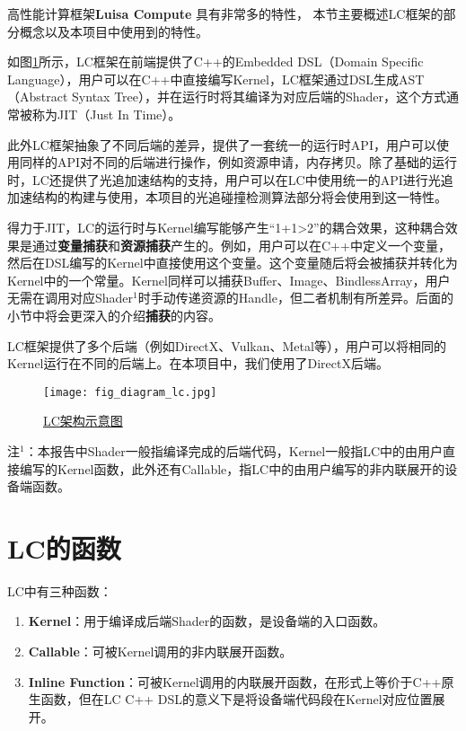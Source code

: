 高性能计算框架\textbf{Luisa Compute} \cite{zhengLuisaRenderHighPerformanceRendering2022}
具有非常多的特性，
本节主要概述LC框架的部分概念以及本项目中使用到的特性。

如图\ref{fig:lc_arch}所示，LC框架在前端提供了C++的Embedded DSL（Domain Specific
Language），用户可以在C++中直接编写Kernel，LC框架通过DSL生成AST（Abstract Syntax Tree），并在运行时将其编译为对应后端的Shader，这个方式通常被称为JIT（Just In Time）。

此外LC框架抽象了不同后端的差异，提供了一套统一的运行时API，用户可以使用同样的API对不同的后端进行操作，例如资源申请，内存拷贝。除了基础的运行时，LC还提供了光追加速结构的支持，用户可以在LC中使用统一的API进行光追加速结构的构建与使用，本项目的光追碰撞检测算法部分将会使用到这一特性。

得力于JIT，LC的运行时与Kernel编写能够产生“1+1>2”的耦合效果，这种耦合效果是通过\textbf{变量捕获}和\textbf{资源捕获}产生的。例如，用户可以在C++中定义一个变量，然后在DSL编写的Kernel中直接使用这个变量。这个变量随后将会被捕获并转化为Kernel中的一个常量。Kernel同样可以捕获Buffer、Image、BindlessArray，用户无需在调用对应Shader$^1$时手动传递资源的Handle，但二者机制有所差异。后面的小节中将会更深入的介绍\textbf{捕获}的内容。

LC框架提供了多个后端（例如DirectX、Vulkan、Metal等），用户可以将相同的Kernel运行在不同的后端上。在本项目中，我们使用了DirectX后端。
\begin{figure}[H]
	\centering
	\texttt{[image: fig\_diagram\_lc.jpg]}
	\caption{\href{https://github.com/LuisaGroup/LuisaCompute/tree/next}{LC架构示意图}}
	\label{fig:lc_arch}
\end{figure}

注$^1$：本报告中Shader一般指编译完成的后端代码，Kernel一般指LC中的由用户直接编写的Kernel函数，此外还有Callable，指LC中的由用户编写的非内联展开的设备端函数。
\section{LC的函数}
LC中有三种函数：
\begin{enumerate}
	\item \textbf{Kernel}：用于编译成后端Shader的函数，是设备端的入口函数。
	\item \textbf{Callable}：可被Kernel调用的非内联展开函数。
	\item \textbf{Inline Function}：可被Kernel调用的内联展开函数，在形式上等价于C++原生函数，但在LC C++ DSL的意义下是将设备端代码段在Kernel对应位置展开。
\end{enumerate}


